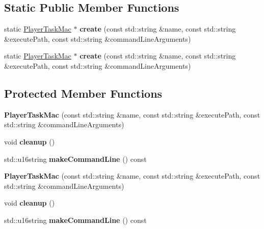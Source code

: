 \subsection*{Static Public Member Functions}
\begin{DoxyCompactItemize}
\item 
\mbox{\label{classPlayerTaskMac_ad3e241608591b9c08e68b32cb63443a7}} 
static \hyperlink{classPlayerTaskMac}{Player\+Task\+Mac} $\ast$ {\bfseries create} (const std\+::string \&name, const std\+::string \&execute\+Path, const std\+::string \&command\+Line\+Arguments)
\item 
\mbox{\label{classPlayerTaskMac_ad7be8ab5a8845fda9bd2f8c829cb4193}} 
static \hyperlink{classPlayerTaskMac}{Player\+Task\+Mac} $\ast$ {\bfseries create} (const std\+::string \&name, const std\+::string \&execute\+Path, const std\+::string \&command\+Line\+Arguments)
\end{DoxyCompactItemize}
\subsection*{Protected Member Functions}
\begin{DoxyCompactItemize}
\item 
\mbox{\label{classPlayerTaskMac_a4e88b35590a3098f38c7360f351d8104}} 
{\bfseries Player\+Task\+Mac} (const std\+::string \&name, const std\+::string \&execute\+Path, const std\+::string \&command\+Line\+Arguments)
\item 
\mbox{\label{classPlayerTaskMac_aea41776d623760be8b298a73f1624d6f}} 
void {\bfseries cleanup} ()
\item 
\mbox{\label{classPlayerTaskMac_a3e9b86b30292b2678e60316da6d5ca76}} 
std\+::u16string {\bfseries make\+Command\+Line} () const
\item 
\mbox{\label{classPlayerTaskMac_a4e88b35590a3098f38c7360f351d8104}} 
{\bfseries Player\+Task\+Mac} (const std\+::string \&name, const std\+::string \&execute\+Path, const std\+::string \&command\+Line\+Arguments)
\item 
\mbox{\label{classPlayerTaskMac_aea41776d623760be8b298a73f1624d6f}} 
void {\bfseries cleanup} ()
\item 
\mbox{\label{classPlayerTaskMac_a3e9b86b30292b2678e60316da6d5ca76}} 
std\+::u16string {\bfseries make\+Command\+Line} () const
\end{DoxyCompactItemize}

